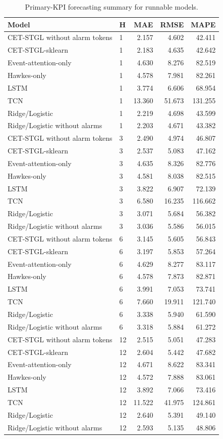 \begin{table}[t]
\centering
\caption{Primary-KPI forecasting summary for runnable models.}
\label{tab:forecasting_main}
\scriptsize
\setlength{\tabcolsep}{4pt}
\begin{tabular}{llrrr}
\toprule
Model & H & MAE & RMSE & MAPE \\
\midrule
CET-STGL without alarm tokens & 1 & 2.157 & 4.602 & 42.411 \\
CET-STGL-sklearn & 1 & 2.183 & 4.635 & 42.642 \\
Event-attention-only & 1 & 4.630 & 8.276 & 82.519 \\
Hawkes-only & 1 & 4.578 & 7.981 & 82.261 \\
LSTM & 1 & 3.774 & 6.606 & 68.954 \\
TCN & 1 & 13.360 & 51.673 & 131.255 \\
Ridge/Logistic & 1 & 2.219 & 4.698 & 43.599 \\
Ridge/Logistic without alarms & 1 & 2.203 & 4.671 & 43.382 \\
CET-STGL without alarm tokens & 3 & 2.490 & 4.974 & 46.807 \\
CET-STGL-sklearn & 3 & 2.537 & 5.083 & 47.162 \\
Event-attention-only & 3 & 4.635 & 8.326 & 82.776 \\
Hawkes-only & 3 & 4.581 & 8.038 & 82.515 \\
LSTM & 3 & 3.822 & 6.907 & 72.139 \\
TCN & 3 & 6.580 & 16.235 & 116.662 \\
Ridge/Logistic & 3 & 3.071 & 5.684 & 56.382 \\
Ridge/Logistic without alarms & 3 & 3.036 & 5.586 & 56.015 \\
CET-STGL without alarm tokens & 6 & 3.145 & 5.605 & 56.843 \\
CET-STGL-sklearn & 6 & 3.197 & 5.853 & 57.264 \\
Event-attention-only & 6 & 4.629 & 8.277 & 83.117 \\
Hawkes-only & 6 & 4.578 & 7.873 & 82.871 \\
LSTM & 6 & 3.991 & 7.053 & 73.741 \\
TCN & 6 & 7.660 & 19.911 & 121.740 \\
Ridge/Logistic & 6 & 3.338 & 5.940 & 61.590 \\
Ridge/Logistic without alarms & 6 & 3.318 & 5.884 & 61.272 \\
CET-STGL without alarm tokens & 12 & 2.515 & 5.051 & 47.283 \\
CET-STGL-sklearn & 12 & 2.604 & 5.442 & 47.682 \\
Event-attention-only & 12 & 4.671 & 8.622 & 83.341 \\
Hawkes-only & 12 & 4.572 & 7.888 & 83.061 \\
LSTM & 12 & 3.892 & 7.066 & 73.416 \\
TCN & 12 & 11.522 & 41.975 & 124.861 \\
Ridge/Logistic & 12 & 2.640 & 5.391 & 49.140 \\
Ridge/Logistic without alarms & 12 & 2.593 & 5.135 & 48.806 \\
\bottomrule
\end{tabular}

\end{table}
